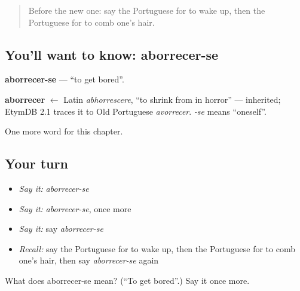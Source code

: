 \label{lesson:PT-C203-aborrecer-se}



\begin{quote}
Before the new one: say the Portuguese for to wake up, then the Portuguese for to comb one's hair.
\end{quote}

\subsection*{You'll want to know: aborrecer-se}
\textbf{aborrecer-se} — \textquotedblleft{}to get bored\textquotedblright{}.

\begin{cousinweb}
\textbf{aborrecer} $\leftarrow$ Latin \emph{abhorrescere}, \textquotedblleft{}to shrink from in horror\textquotedblright{} — inherited; EtymDB 2.1 traces it to Old Portuguese \emph{avorrecer}. \emph{-se} means \textquotedblleft{}oneself\textquotedblright{}.
\end{cousinweb}

\begin{grammarlens}[title={What you've built}]
One more word for this chapter.
\end{grammarlens}

\subsection*{Your turn}
\begin{itemize}
\raggedright
  \item \emph{Say it:} \emph{aborrecer-se}
  \item \emph{Say it:} \emph{aborrecer-se}, once more
  \item \emph{Say it:} say \emph{aborrecer-se}
  \item \emph{Recall:} say the Portuguese for to wake up, then the Portuguese for to comb one's hair, then say \emph{aborrecer-se} again
\end{itemize}

\begin{tcolorbox}[breakable,colback=teal!4,colframe=teal!35!black,title={Before you move on}]
What does aborrecer-se mean? (\textquotedblleft{}To get bored\textquotedblright{}.) Say it once more.
\end{tcolorbox}
